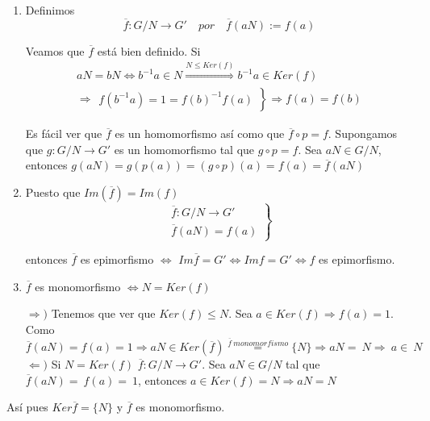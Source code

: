 \documentclass{article}
\begin{document}
\begin{enumerate}[(1)]
\item Definimos
\begin{equation*}
\overline{f}:G/N\rightarrow G' \quad por\quad \overline{f}(aN):=f(a)
\end{equation*}

Veamos que $\overline{f}$ está bien definido. Si 
\begin{gather*}
aN=bN\Leftrightarrow b^{-1}a\in N\overset{N\leq Ker(f)}{\Rightarrow} b^{-1}a\in Ker(f) \\
\Rightarrow \left. \begin{array}{c}
f(b^{-1}a)=1=f(b)^{-1}f(a)
\end{array} \right\rbrace \Rightarrow f(a)=f(b)
\end{gather*}

Es fácil ver que $\overline{f}$ es un homomorfismo así como que $\overline{f}\circ p=f$. Supongamos que $g:G/N\rightarrow G'$ es un homomorfismo tal que $g\circ p=f$. Sea $aN\in G/N$, entonces $g(aN)=g(p(a))=(g\circ p)(a)=f(a)=\overline{f}(aN)$ 

\item Puesto que $Im(\overline{f})=Im(f)$
\begin{equation*}
\left. \begin{array}{c}
\overline{f}:G/N\rightarrow G'\\
\overline{f}(aN)=f(a)
\end{array} \right\rbrace
\end{equation*}

entonces $\overline{f}$ es epimorfismo $\Leftrightarrow$ $Im\overline{f}=G'\Leftrightarrow Imf=G'\Leftrightarrow f$ es epimorfismo.

\item $\overline{f}$ es monomorfismo $\Leftrightarrow N=Ker(f)$

$\Rightarrow)$ Tenemos que ver que $Ker(f)\leq N$. Sea $a\in Ker(f)\Rightarrow f(a)=1$. Como $\overline{f}(aN)=f(a)=1\Rightarrow aN\in Ker(\overline{f})\overset{\overline{f}\:monomorfismo}{=}\{N\}\Rightarrow aN=~N\Rightarrow~a\in~N$ \\

$\Leftarrow)$ Si $N=Ker(f)$ $\overline{f}:G/N\rightarrow G'$. Sea $aN\in G/N$ tal que $\overline{f}(aN)=~f(a)=~1$, entonces $a\in Ker(f)=N\Rightarrow aN=N$
\end{enumerate}

Así pues $Ker\overline{f}=\{N\}$ y $\overline{f}$ es monomorfismo.
\end{document}

